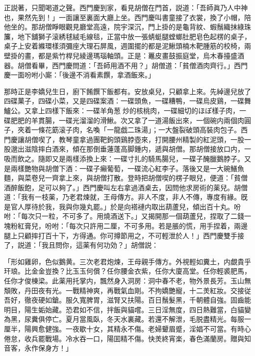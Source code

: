 正説著，只聞喝道之聲。西門慶到家，看見胡僧在門首，説道：「吾師眞乃人中神也，果然先到！」一面讓至裏面大廳上坐。西門慶叫書童接了衣裳，換了小帽，陪他坐的。那胡僧睜眼觀見廳堂高遠，院宇深沉，門上掛的是龜背紋、蝦鬚織抹綠珠簾，地下舖獅子滚綉毬絨毛線毯，正當中放一張蜻蜓腿螳螂肚肥皂色起楞的桌子，桌子上安着縧環樣須彌座大理石屏風，週圍擺的都是泥鰍頭楠木靶腫筋的校椅，兩壁掛的畫，都是紫竹桿兒綾邊瑪瑙軸頭。正是：鼉皮畫鼓振庭堂，烏木春擡盛酒器。胡僧看畢，西門慶問道：「吾師用酒不用？」胡僧道：「貧僧酒肉齊行。」西門慶一面吩咐小廝：「後邊不消看素饌，拿酒飯來。」

那時正是李嬌兒生日，廚下餚饌下飯都有。安放桌兒，只顧拿上來。先綽邊兒放了四碟菓子，四碟小菜，又是四碟案酒：一碟頭魚，一碟糟鴨，一碟烏皮鷄，一碟舞鱸公。又拿上四樣下飯來：一碟羊角葱𤆑炒的核桃肉，一碟細切的ほぽ樣子肉，一碟肥肥的羊貫腸，一碟光溜溜的滑鰍。次又拿了一道湯飯出來，一個碗内兩個肉圓子，夾着一條花筯滚子肉，名喚「一龍戯二珠湯」；一大盤裂破頭高裝肉包子。西門慶讓胡僧喫了，教琴童拿過團靶鉤頭鷄脖壺來，打開腰州精製的紅泥頭，一股一股邈出滋陰摔白酒來，傾在那倒垂蓮蓬高脚鍾内，遞與胡僧。那胡僧接放口内，一吸而飲之。隨即又是兩樣添換上來：一碟寸扎的騎馬腸兒，一碟子醃臘鵝脖子。又是兩樣艷物與胡僧下酒：一碟子癩葡萄，一碟流心紅李子。落後又是一大碗鱔魚麵，與菜卷兒一齊拿上來，與胡僧打散。登時把胡僧喫的楞子眼兒，便道：「貧僧酒醉飯飽，足可以夠了。」西門慶叫左右拿過酒桌去，因問他求房術的薬兒。胡僧道：「我有一枝薬，乃老君煉就，王母傳方。非人不度，非人不傳，專度有緣。旣是官人厚待於我，我與你幾丸罷。」於是向褡褳内取出葫蘆兒，傾出百十丸。吩咐：「每次只一粒，不可多了。用燒酒送下。」又揭開那一個葫蘆兒，捏取了二錢一塊粉紅膏兒，吩咐：「每次只許用二厘，不可多用。若是脹的慌，用手捏着，兩邊腿上只顧摔打百十下，方得通。你可撙節用之，不可輕泄於人！」西門慶雙手接了，説道：「我且問你，這薬有何功効？」胡僧説：

\begin{myquote}[\markfont]
「形如雞卵，色似鵝黄。三次老君炮煉，王母親手傳方。外視輕如糞土，内覷貴乎玕琅。比金金豈換？比玉玉何償？任你腰金衣紫，任你大廈高堂。任你輕裘肥馬，任你才俊棟梁。此薬用托掌内，飄然身入洞房：洞中春不老，物外景長芳。玉山無頽敗，丹田夜有光。一戰精神爽，再戰氣血剛。不拘嬌艷寵，十二羙紅妝。交接従吾好，徹夜硬如鎗。服久寬脾胃，滋腎又扶陽。百日鬚髮黑，千朝體自強。固齒能明目，陽生姤始藏。恐君如不信，拌飯與貓嚐。三日淫無度，四日熱難當，白貓變為黑，尿糞俱停亡。夏月當風臥，冬天水裏藏。若還不解泄，毛脱盡精光。每服一厘半，陽興愈健強。一夜歇十女，其精永不傷。老婦顰眉蹙，淫娼不可當。有時心倦怠，收兵罷戰場。冷水吞一口，陽囬精不傷。快羙終宵楽，春色滿蘭房。贈與知音客，永作保身方！」
\end{myquote}

